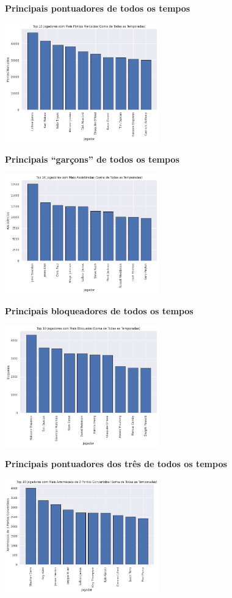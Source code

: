 \documentclass[
]{book}
\begin{document}
\textbf{Principais pontuadores de todos os tempos}

\includegraphics[width=0.5\textwidth,height=\textheight]{imagens/16.png}

\textbf{Principais ``garçons'' de todos os tempos}

\includegraphics[width=0.5\textwidth,height=\textheight]{imagens/17.png}

\textbf{Principais bloqueadores de todos os tempos}

\includegraphics[width=0.5\textwidth,height=\textheight]{imagens/18.png}

\textbf{Principais pontuadores dos três de todos os tempos}

\includegraphics[width=0.5\textwidth,height=\textheight]{imagens/19.png}
\end{document}
